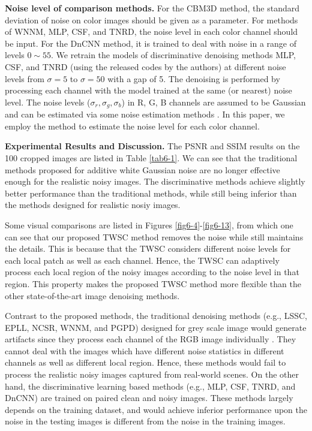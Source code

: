 \textbf{Noise level of comparison methods.} For the CBM3D method, the standard deviation of noise on color images should be given as a parameter. For methods of WNNM, MLP, CSF, and TNRD, the noise level in each color channel should be input. For the DnCNN method, it is trained to deal with noise in a range of levels $0\sim55$. We retrain the models of discriminative denoising methods MLP, CSF, and TNRD (using the released codes by the authors) at different noise levels from $\sigma=5$ to $\sigma=50$ with a gap of 5. The denoising is performed by processing each channel with the model trained at the same (or nearest) noise level. The noise levels ($\sigma_{r}, \sigma_{g}, \sigma_{b}$) in R, G, B channels are assumed to be Gaussian and can be estimated via some noise estimation methods \cite{noiselevel,Chen2015ICCV}. In this paper, we employ the method \cite{noiselevel} to estimate the noise level for each color channel.


\textbf{Experimental Results and Discussion.}
The PSNR and SSIM \cite{ssim} results on the 100 cropped images are listed in Table \ref{tab6-1}. We can see that the traditional methods proposed for additive white Gaussian noise are no longer effective enough for the realistic noisy images. The discriminative methods achieve slightly better performance than the traditional methods, while still being inferior than the methods designed for realistic nosiy images.

Some visual comparisons are listed in Figures \ref{fig6-4}-\ref{fig6-13}, from which one can see that our proposed TWSC method removes the noise while still maintains the details. This is because that the TWSC considers different noise levels for each local patch as well as each channel. Hence, the TWSC can adaptively process each local region of the noisy images according to the noise level in that region. This property makes the proposed TWSC method more flexible than the other state-of-the-art image denoising methods. 

Contrast to the proposed methods, the traditional denoising methods (e.g., LSSC, EPLL, NCSR, WNNM, and PGPD) designed for grey scale image would generate artifacts since they process each channel of the RGB image individually \cite{srcolor}. They cannot deal with the images which have different noise statistics in different channels as well as different local region. Hence, these methods would fail to process the realistic noisy images captured from real-world scenes. On the other hand, the discriminative learning based methods (e.g., MLP, CSF, TNRD, and DnCNN) are trained on paired clean and noisy images. These methods largely depends on the training dataset, and would achieve inferior performance upon the noise in the testing images is different from the noise in the training images.

